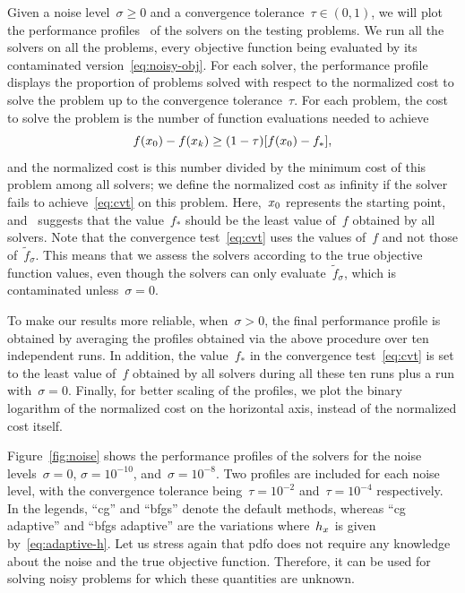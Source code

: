 \documentclass[
    smallextended,  %
    final,          %
]{svjour3}
\newcommand{\iter}[1][k]{x\ifthenelse{\equal{#1}{}}{}{_{#1}}}
\newcommand{\obj}{f}
\newcommand{\modified}[1]{\texorpdfstring{{\color{RoyalBlue}#1}}{#1}}
\begin{document}
Given a noise level~$\sigma\ge 0$ and a convergence tolerance~$\tau\in(0,1)$, we will plot the performance profiles~\cite{More_Wild_2009} of the solvers on the testing problems.
We run all the solvers on all the problems, every objective function being evaluated by its contaminated version~\eqref{eq:noisy-obj}.
For each solver, the performance profile displays the proportion of problems solved with respect to the normalized cost to solve the problem up to the convergence tolerance~$\tau$.
For each problem, the cost to solve the problem is the number of function evaluations needed to achieve
\begin{equation}
    \label{eq:cvt}
    \obj(\iter[0]) - \obj(\iter) \ge (1 - \tau) [\obj(\iter[0]) - \obj_{\ast}],
\end{equation}
and the normalized cost is this number divided by the minimum cost of this problem among all solvers; we define the normalized cost as infinity if the solver fails to achieve~\eqref{eq:cvt} on this problem.
Here,~$\iter[0]$ represents the starting point, and~\cite[\S~2.1]{More_Wild_2009} suggests that the value~$\obj_{\ast}$ should be the least value of~$\obj$ obtained by all solvers.
Note that the convergence test~\eqref{eq:cvt} uses the values of~$\obj$ and not those of~$\tilde{\obj}_\sigma$.
This means that we assess the solvers according to the true objective function values, even though the solvers can only evaluate~$\tilde{\obj}_\sigma$, which is contaminated unless~$\sigma = 0$.

To make our results more reliable, when~$\sigma>0$, the final performance profile is obtained by averaging the profiles obtained via the above procedure over ten independent runs.
In addition, the value~$\obj_{\ast}$ in the convergence test~\eqref{eq:cvt} is set to the least value of~$\obj$ obtained by all solvers during all these ten runs plus a run with~$\sigma = 0$.
Finally, for better scaling of the profiles, we plot the binary logarithm of the normalized cost on the horizontal axis, instead of the normalized cost itself.

Figure~\ref{fig:noise} shows the performance profiles of the solvers for the noise levels~$\sigma = 0$, $\sigma = 10^{-10}$, and~$\sigma = 10^{-8}$.
Two profiles are included for each noise level, with the convergence tolerance being~$\tau = 10^{-2}$ and~$\tau = 10^{-4}$ respectively.
\modified{
    In the legends, ``\gls{cg}'' and ``\gls{bfgs}'' denote the default methods, whereas ``\gls{cg} adaptive'' and ``\gls{bfgs} adaptive'' are the variations where~$h_{\iter[]}$ is given by~\eqref{eq:adaptive-h}.
    Let us stress again that \gls{pdfo} does not require any knowledge about the noise and the true objective function.
    Therefore, it can be used for solving noisy problems for which these quantities are unknown.
}
\end{document}
